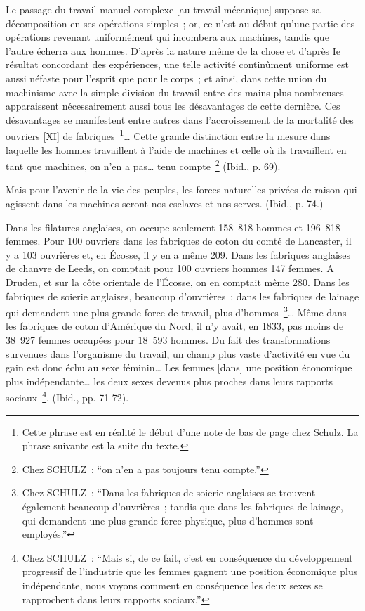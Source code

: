 \documentclass[french,twoside]{book} %
\newenvironment{quoteblock}%
  {\begin{quoting}}
  {\end{quoting}}
\newenvironment{quotebar}{%
    \def\FrameCommand{{\color{rubric!10!}\vrule width 0.5em} \hspace{0.9em}}%
    \def\OuterFrameSep{\itemsep} %
    \MakeFramed {\advance\hsize-\width \FrameRestore}
  }%
  {%
    \endMakeFramed
  }
\renewenvironment{quoteblock}%
  {%
    \savenotes
    \setstretch{0.9}
    \normalfont
    \begin{quotebar}
  }
  {%
    \end{quotebar}
    \spewnotes
  }
\begin{document}
\begin{quoteblock}
 Le passage du travail manuel complexe [au travail mécanique] suppose sa décomposition en ses opérations simples ; or, ce n’est au début qu’une partie des opérations revenant uniformément qui incombera aux machines, tandis que l’autre écherra aux hommes. D’après la nature même de la chose et d’après Ie résultat concordant des expériences, une telle activité continûment uniforme est aussi néfaste pour l’esprit que pour le corps ; et ainsi, dans cette union du machinisme avec la simple division du travail entre des mains plus nombreuses apparaissent nécessairement aussi tous les désavantages de cette dernière. Ces désavantages se manifestent entre autres dans l’accroissement de la mortalité des ouvriers [XI] de fabriques \footnote{Cette phrase est en réalité le début d’une note de bas de page chez Schulz. La phrase suivante est la suite du texte.}… Cette grande distinction entre la mesure dans laquelle les hommes travaillent à l’aide de machines et celle où ils travaillent en tant que machines, on n’en a pas… tenu compte \footnote{Chez SCHULZ : “on n’en a pas toujours tenu compte.”} (Ibid., p. 69).\par
 Mais pour l’avenir de la vie des peuples, les forces naturelles privées de raison qui agissent dans les machines seront nos esclaves et nos serves. (Ibid., p. 74.)\par
 Dans les filatures anglaises, on occupe seulement 158 818 hommes et 196 818 femmes. Pour 100 ouvriers dans les fabriques de coton du comté de Lancaster, il y a 103 ouvrières et, en Écosse, il y en a même 209. Dans les fabriques anglaises de chanvre de Leeds, on comptait pour 100 ouvriers hommes 147 femmes. A Druden, et sur la côte orientale de l’Écosse, on en comptait même 280. Dans les fabriques de soierie anglaises, beaucoup d’ouvrières ; dans les fabriques de lainage qui demandent une plus grande force de travail, plus d’hommes \footnote{Chez SCHULZ : “Dans les fabriques de soierie anglaises se trouvent également beaucoup d’ouvrières ; tandis que dans les fabriques de lainage, qui demandent une plus grande force physique, plus d’hommes sont employés.”}… Même dans les fabriques de coton d’Amérique du Nord, il n’y avait, en 1833, pas moins de 38 927 femmes occupées pour 18 593 hommes. Du fait des transformations survenues dans l’organisme du travail, un champ plus vaste d’activité en vue du gain est donc échu au sexe féminin… Les femmes [dans] une position économique plus indépendante… les deux sexes devenus plus proches dans leurs rapports sociaux \footnote{Chez SCHULZ : “Mais si, de ce fait, c’est en conséquence du développement progressif de l’industrie que les femmes gagnent une position économique plus indépendante, nous voyons comment en conséquence les deux sexes se rapprochent dans leurs rapports sociaux.”}. (Ibid., pp. 71-72).\par

\end{quoteblock}
\end{document}
